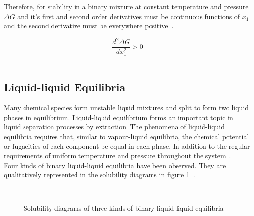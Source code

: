 Therefore, for stability in a binary mixture at constant temperature and pressure $\Delta G$ and it's first and second order derivatives must be continuous functions of $x_{1}$ and the second derivative must be everywhere positive~\cite{SmithNessAbbott}.\

\begin{equation}
\frac{d^{2} \Delta G}{ dx_{1}^{2} } > 0
\end{equation}\

\subsection{Liquid-liquid Equilibria} \label{LiquidLiquidEquilibriaSection}

Many chemical species form unstable liquid mixtures and split to form two liquid phases in equilibrium. Liquid-liquid equilibrium forms an important topic in liquid separation processes by extraction. The phenomena of liquid-liquid equilibria requires that, similar to vapour-liquid equilibria, the chemical potential or fugacities of each component be equal in each phase. In addition to the regular requirements of uniform temperature and pressure throughout the system~\cite{ SmithNessAbbott, BilevelOptimization}.\\

Four kinds of binary liquid-liquid equilibria have been observed. They are qualitatively represented in the solubility diagrams in figure \ref{BinaryLLEDrawing}~\cite{ SmithNessAbbott, Dechema, GasLiquidProperties}.\\

\begin{figure}[t]
\begin{center}
\resizebox{0.5\textwidth}{!}{}\\
\end{center}
\caption{Solubility diagrams of three kinds of binary liquid-liquid equilibria} \label{BinaryLLEDrawing}
\end{figure}	

